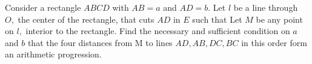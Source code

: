 Consider a rectangle $ABCD$ with $AB = a$ and $AD = b.$ Let $l$ be a line through $O,$ the center of the rectangle, that cuts $AD$ in  $E$ such that  Let $M$ be any point on $l,$ interior to the rectangle.
Find the necessary and suﬃcient condition on $a$ and $b$ that the four distances from M to lines $AD, AB, DC, BC$ in this order form an arithmetic progression.